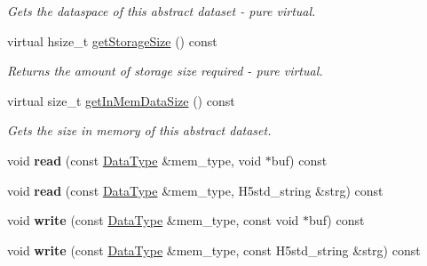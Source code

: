\begin{DoxyCompactItemize}
\begin{DoxyCompactList}\small\item\em Gets the dataspace of this abstract dataset -\/ pure virtual. \end{DoxyCompactList}\item 
\mbox{\label{class_h5_1_1_attribute_a4000e34b9f71960431c1739093f15a42}} 
virtual hsize\+\_\+t \hyperlink{class_h5_1_1_attribute_a4000e34b9f71960431c1739093f15a42}{get\+Storage\+Size} () const
\begin{DoxyCompactList}\small\item\em Returns the amount of storage size required -\/ pure virtual. \end{DoxyCompactList}\item 
\mbox{\label{class_h5_1_1_attribute_ae344096e631c00ac0552c5046872fc06}} 
virtual size\+\_\+t \hyperlink{class_h5_1_1_attribute_ae344096e631c00ac0552c5046872fc06}{get\+In\+Mem\+Data\+Size} () const
\begin{DoxyCompactList}\small\item\em Gets the size in memory of this abstract dataset. \end{DoxyCompactList}\item 
\mbox{\label{class_h5_1_1_attribute_a18b3466d2b725c15ac941daee88019bf}} 
void {\bfseries read} (const \hyperlink{class_h5_1_1_data_type}{Data\+Type} \&mem\+\_\+type, void $\ast$buf) const
\item 
\mbox{\label{class_h5_1_1_attribute_aed73095cbbee90b1861cf61402e57289}} 
void {\bfseries read} (const \hyperlink{class_h5_1_1_data_type}{Data\+Type} \&mem\+\_\+type, H5std\+\_\+string \&strg) const
\item 
\mbox{\label{class_h5_1_1_attribute_a8b294b320537b0d77b89be8d8266133e}} 
void {\bfseries write} (const \hyperlink{class_h5_1_1_data_type}{Data\+Type} \&mem\+\_\+type, const void $\ast$buf) const
\item 
\mbox{\label{class_h5_1_1_attribute_a751c54bde214b2a9d028dc41dc7ad209}} 
void {\bfseries write} (const \hyperlink{class_h5_1_1_data_type}{Data\+Type} \&mem\+\_\+type, const H5std\+\_\+string \&strg) const
\item 

\end{DoxyCompactItemize}
